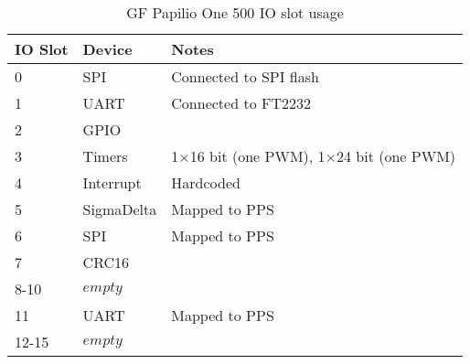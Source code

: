 \begin{table}[H]
\begin{center}
\begin{tabularx}{14cm}{llX}
IO Slot & Device & Notes \\
\hline
0 & SPI & Connected to SPI flash \\
1 & UART & Connected to FT2232 \\
2 & GPIO & \\
3 & Timers & 1$\times$16 bit (one PWM), 1$\times$24 bit (one PWM) \\
4 & Interrupt & Hardcoded \\
5 & SigmaDelta & Mapped to PPS \\
6 & SPI & Mapped to PPS \\
7 & CRC16 & \\
8-10 & $empty$ & \\
11 & UART & Mapped to PPS \\
12-15 & $empty $ & 
\end{tabularx}
\caption{GF Papilio One 500 IO slot usage}
\end{center}
\end{table}
